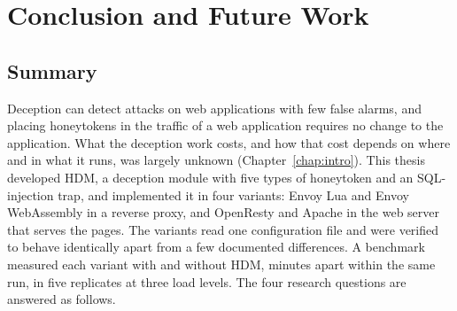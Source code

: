 \documentclass{rptuma}
\begin{document}
\chapter{Conclusion and Future Work}
\label{chap:conclusion}

\section{Summary}
\label{sec:concl.summary}

Deception can detect attacks on web applications with few false alarms, and placing honeytokens in
the traffic of a web application requires no change to the application. What the deception work
costs, and how that cost depends on where and in what it runs, was largely unknown
(Chapter~\ref{chap:intro}). This thesis developed HDM, a deception module with five types of
honeytoken and an SQL-injection trap, and implemented it in four variants: Envoy Lua and Envoy
WebAssembly in a reverse proxy, and OpenResty and Apache in the web server that serves the pages.
The variants read one configuration file and were verified to behave identically apart from a few
documented differences. A benchmark measured each variant with and without HDM, minutes
apart within the same run, in five replicates at three load levels. The four research questions
are answered as follows.
\end{document}
